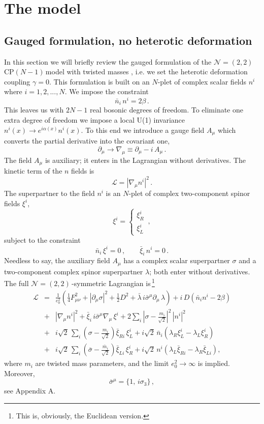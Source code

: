 \documentclass[epsfig,12pt]{article}
\def\beq{\begin{equation}}
\def\eeq{\end{equation}}
\def\beqn{\begin{eqnarray}}
\def\eeqn{\end{eqnarray}}
\newcommand{\ntt}{${\mathcal N}=(2,2)\,$}
\newcommand{\cpn}{CP$(N-1)\,$}
\newcommand{\cell}{{\mathcal L}}
\newcommand{\pt}{\partial}
\def\beqn{\begin{eqnarray}}
\def\eeqn{\end{eqnarray}}
\def\beq{\begin{equation}}
\def\eeq{\end{equation}}
\begin{document}
\section{The model}

\subsection{Gauged formulation, no heterotic deformation}

In this section we will briefly review the gauged formulation \cite{W79,W93} of
the \mbox{\ntt} \cpn model with twisted masses
\cite{twisted}, i.e. we set the heterotic deformation coupling
$\gamma = 0$.
This formulation is built on an $N$-plet of complex scalar fields $n^i$ where $i=1,2,...,N$.
We impose the constraint
\beq
\bar n_i \,n^i = 2\beta \,.
\eeq
This leaves us with $2N-1$ real bosonic degrees of freedom. To eliminate one extra degree
of freedom we impose a local U(1) invariance $n^i(x)\to e^{i\alpha(x)} n^i(x)$.
To this end we introduce a gauge field $A_\mu$ which converts the partial derivative into the
covariant one,
\beq
\partial_\mu\to \nabla_\mu \equiv \partial_\mu -i\,  A_\mu\,.
\eeq
The field $A_\mu$ is auxiliary; it enters in the Lagrangian without derivatives. The kinetic term of the
$n$ fields is
\beq
\cell  = \left|\nabla_\mu n^i\right|^2\,.
\eeq
The superpartner to the field $n^i$ is an $N$-plet of complex two-component spinor fields $\xi^i$,
\beq
\xi^i =\left\{\begin{array}{l}
\xi^i_R\\[2mm]
\xi^i_L
\end{array}
\right.\,,
\eeq
subject to the constraint
\beq
\bar{n}_i\,\xi^i =0\,,\qquad \bar\xi_i\,n^i = 0\,.
\label{npxi}
\eeq
Needless to say, the auxiliary field $A_\mu$ has a complex scalar superpartner $\sigma$ 
and a two-component complex spinor superpartner $\lambda$; both enter without derivatives.
The full \ntt-symmetric Lagrangian is\,\footnote{This is, obviously, the Euclidean version.}
\beqn
\cell &=& 
\frac{1}{e_0^2}\left(\frac{1}{4} F_{\mu\nu}^2 +\left|\pt_\mu\sigma\right|^2 + \frac{1}{2}D^2
+\bar\lambda \, i\bar{\sigma}^\mu\pt_\mu\,\lambda
\right) + i\,D\left(\bar{n}_i n^i -2\beta
\right)
\nonumber\\[3mm]
&+&
\left|\nabla_\mu n^i\right|^2+ \bar{\xi}_i\, i\bar{\sigma}^\mu\nabla_\mu\,\xi^i
+ 2\sum_i\left|\sigma-\frac{m_i}{\sqrt 2}\right|^2\, |n^i|^2
\nonumber\\[3mm]
&+&
i\sqrt{2}\,\sum_i \left( \sigma -\frac{m_i}{\sqrt 2}\right)\bar\xi_{Ri}\, \xi^i_L +i\sqrt{2}\,\bar{n}_i
\left(\lambda_R\xi^i_L - \lambda_L\xi^i_R
\right)
\nonumber\\
&+&
i\sqrt{2}\,\sum_i \left( \bar\sigma -\frac{\bar{m}_i}{\sqrt 2}\right)\bar\xi_{Li}\, \xi^i_R +i\sqrt{2}\,{n}^i
\left(\lambda_L\bar\xi_{Ri} - \lambda_R\bar\xi_{Li}
\right),
\label{bee31}
\eeqn
where $m_i$ are twisted mass parameters, and the limit $e_0^2\to\infty$ is implied. 
Moreover,
\beq
\bar\sigma^\mu = \{1,\,i\sigma_3\}\,,
\eeq
see Appendix A.
\end{document}
